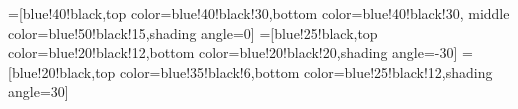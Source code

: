 =[blue!40!black,top color=blue!40!black!30,bottom color=blue!40!black!30,
                    middle color=blue!50!black!15,shading angle=0]
=[blue!25!black,top color=blue!20!black!12,bottom color=blue!20!black!20,shading angle=-30]
=[blue!20!black,top color=blue!35!black!6,bottom color=blue!25!black!12,shading angle=30]


\usepackage{framed}

\renewenvironment{leftbar}{%
  \def\FrameCommand{\textcolor{myyellow}{\vrule width 1.4pt depth 5pt}\hspace*{15pt}}%
  \MakeFramed{\advance\hsize-\width\FrameRestore}}%
 {\endMakeFramed}


\makeatletter


\renewcommand\chapternumberline[1]{\mbox{\small\itshape\rmfamily\@chapapp~#1}\par\noindent\large}
\renewcommand\cftchapterfont{\sffamily}
\renewcommand\cftchapterpagefont{\LARGE\bfseries\color{red}}

\newcommand*{\l@mychap}[3]{%
  \def\@chapapp{#3}
  \vskip1ex%
  \par\noindent\begin{minipage}{\textwidth}%
  \parbox{1em}{%
    \hfill{\cftchapterpagefont#2}%
  }\hspace*{1.5em}%
  \parbox{\dimexpr\textwidth-4.5em-15pt\relax}{%
    \leftbar\cftchapterfont#1\hspace{1sp}\endleftbar%
  }%
  \end{minipage}\par%
}

\renewcommand*{\l@chapter}[2]{%
  \l@mychap{#1}{#2}{\chaptername}%
}

\renewcommand*{\l@appendix}[2]{%
  \l@mychap{#1}{#2}{\appendixname}%
}

